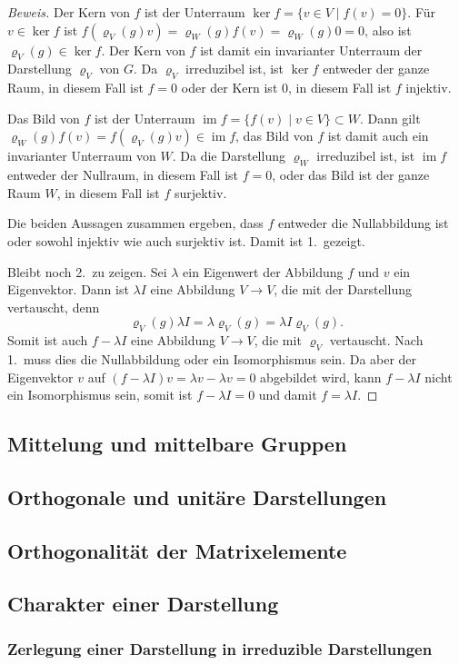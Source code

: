 \begin{proof}[Beweis]
Der Kern von $f$ ist der Unterraum
$\operatorname{ker}f = \{v\in V\mid f(v)=0\}$.
Für $v\in\operatorname{ker}f$ ist
$f(\varrho_V(g)v) = \varrho_W(g) f(v) = \varrho_W(g) 0=0$, also ist
$\varrho_V(g)\in\operatorname{ker}f$.
Der Kern von $f$ ist damit ein invarianter Unterraum der Darstellung
$\varrho_V$ von $G$.
Da $\varrho_V$ irreduzibel ist, ist $\operatorname{ker}f$ entweder
der ganze Raum, in diesem Fall ist $f=0$ oder der Kern ist $0$, in diesem
Fall ist $f$ injektiv.

Das Bild von $f$ ist der Unterraum
$\operatorname{im}f = \{f(v)\mid v\in V\}\subset W$.
Dann gilt
$\varrho_W(g)f(v) = f(\varrho_V(g)v)\in\operatorname{im}f$, das Bild von
$f$ ist damit auch ein invarianter Unterraum von $W$.
Da die Darstellung $\varrho_W$  irreduzibel ist, ist $\operatorname{im}f$
entweder der Nullraum, in diesem Fall ist $f=0$, oder das Bild ist der
ganze Raum $W$, in diesem Fall ist $f$ surjektiv.

Die beiden Aussagen zusammen ergeben, dass $f$ entweder die Nullabbildung
ist oder sowohl injektiv wie auch surjektiv ist.
Damit ist 1.~gezeigt.

Bleibt noch 2.~zu zeigen.
Sei $\lambda$ ein Eigenwert der Abbildung $f$ und $v$ ein Eigenvektor.
Dann ist $\lambda I$ eine
Abbildung $V\to V$, die mit der Darstellung vertauscht, denn
\[
\varrho_V(g)\lambda I =
\lambda \varrho_V(g) = \lambda I\varrho_V(g).
\]
Somit ist auch $f-\lambda I$ eine Abbildung $V\to V$, die mit $\varrho_V$
vertauscht.
Nach 1.~muss dies die Nullabbildung oder ein Isomorphismus sein.
Da aber der Eigenvektor $v$ auf $(f-\lambda I)v = \lambda v - \lambda v = 0$
abgebildet wird, kann $f-\lambda I$ nicht ein Isomorphismus sein, somit
ist $f-\lambda I=0$ und damit $f=\lambda I$.
\end{proof}



%
%
\subsection{Mittelung und mittelbare Gruppen}

%
%
\subsection{Orthogonale und unitäre Darstellungen}

%
%
\subsection{Orthogonalität der Matrixelemente}

%
%
\subsection{Charakter einer Darstellung}

%
%
\subsubsection{Zerlegung einer Darstellung in irreduzible Darstellungen}
